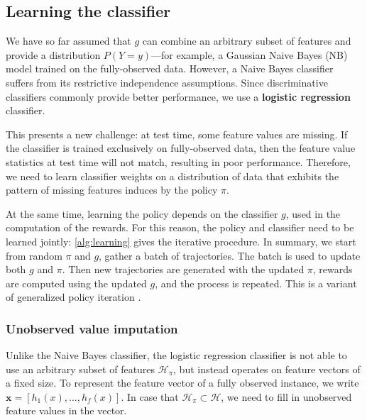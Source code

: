 \subsection{Learning the classifier}\label{sec:classifier}

We have so far assumed that $g$ can combine an arbitrary subset of features and provide a distribution $P(Y = y)$---for example, a Gaussian Naive Bayes (NB) model trained on the fully-observed data.
However, a Naive Bayes classifier suffers from its restrictive independence assumptions.
Since discriminative classifiers commonly provide better performance, we use a \textbf{logistic regression} classifier.

This presents a new challenge: at test time, some feature values are missing.
If the classifier is trained exclusively on fully-observed data, then the feature value statistics at test time will not match, resulting in poor performance.
Therefore, we need to learn classifier weights on a distribution of data that exhibits the pattern of missing features induces by the policy $\pi$.



At the same time, learning the policy depends on the classifier $g$, used in the computation of the rewards.
For this reason, the policy and classifier need to be learned jointly: \autoref{alg:learning} gives the iterative procedure.
In summary, we start from random $\pi$ and $g$, gather a batch of trajectories.
The batch is used to update both $g$ and $\pi$.
Then new trajectories are generated with the updated $\pi$, rewards are computed using the updated $g$, and the process is repeated.
This is a variant of generalized policy iteration \cite{Sutton1998}.

\subsubsection{Unobserved value imputation}

Unlike the Naive Bayes classifier, the logistic regression classifier is not able to use an arbitrary subset of features $\mathcal{H}_\pi$, but instead operates on feature vectors of a fixed size.
To represent the feature vector of a fully observed instance, we write $\mathbf{x} = [h_1(x), \dots, h_f(x)]$.
In case that $\mathcal{H}_\pi \subset \mathcal{H}$, we need to fill in unobserved feature values in the vector.

